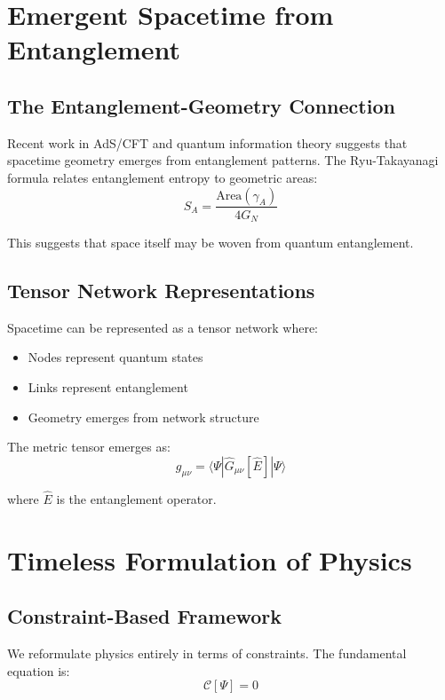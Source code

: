 \documentclass[12pt,a4paper]{article}
\begin{document}
\section{Emergent Spacetime from Entanglement}

\subsection{The Entanglement-Geometry Connection}

Recent work in AdS/CFT and quantum information theory suggests that spacetime geometry emerges from entanglement patterns. The Ryu-Takayanagi formula relates entanglement entropy to geometric areas:
\begin{equation}
S_A = \frac{\text{Area}(\gamma_A)}{4G_N}
\end{equation}

This suggests that space itself may be woven from quantum entanglement.

\subsection{Tensor Network Representations}

Spacetime can be represented as a tensor network where:
\begin{itemize}
\item Nodes represent quantum states
\item Links represent entanglement
\item Geometry emerges from network structure
\end{itemize}

The metric tensor emerges as:
\begin{equation}
g_{\mu\nu} = \langle \Psi | \hat{G}_{\mu\nu}[\hat{E}] | \Psi \rangle
\end{equation}

where $\hat{E}$ is the entanglement operator.

\section{Timeless Formulation of Physics}

\subsection{Constraint-Based Framework}

We reformulate physics entirely in terms of constraints. The fundamental equation is:
\begin{equation}
\mathcal{C}[\Psi] = 0
\end{equation}
\end{document}
